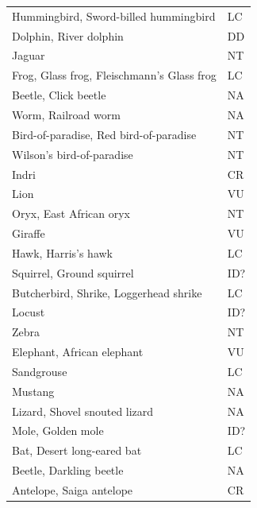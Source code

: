 \documentclass[12pt,letterpaper]{article}
\begin{document}
\begin{center}
\begin{longtable}{ll}
Hummingbird, Sword-billed hummingbird           & LC          \\
Dolphin, River dolphin                          & DD          \\
Jaguar                                          & NT          \\
Frog, Glass frog, Fleischmann's Glass frog      & LC          \\
Beetle, Click beetle                            & NA          \\
Worm, Railroad worm                             & NA          \\
Bird-of-paradise, Red bird-of-paradise          & NT          \\
Wilson's bird-of-paradise                       & NT          \\
Indri                                           & CR          \\
Lion                                            & VU          \\
Oryx, East African oryx                         & NT          \\
Giraffe                                         & VU          \\
Hawk, Harris's hawk                             & LC          \\
Squirrel, Ground squirrel                       & ID?         \\
Butcherbird, Shrike, Loggerhead shrike          & LC          \\
Locust                                          & ID?         \\
Zebra                                           & NT          \\
Elephant, African elephant                      & VU          \\
Sandgrouse                                      & LC          \\
Mustang                                         & NA          \\
Lizard, Shovel snouted lizard                   & NA          \\
Mole, Golden mole                               & ID?         \\
Bat, Desert long-eared bat                      & LC          \\
Beetle, Darkling beetle                         & NA          \\
Antelope, Saiga antelope                        & CR          \\

\end{longtable}
\end{center}
\end{document}
